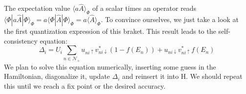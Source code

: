 \documentclass[../main.tex]{subfile}
\begin{document}
The expectation value $\langle a\hat{A}\rangle_{\Phi}$ of a scalar times an operator reads $\langle \Phi|a \hat{A}|\Phi\rangle_{\Phi} = a \langle \Phi|\hat{A}|\Phi\rangle_{\Phi} = a \langle \hat{A}\rangle_{\Phi}$. 
To convince ourselves, we just take a look at the first quantization expression of this braket. This result leads to the self-consistency equation:
\begin{equation}\label{eq:SelfConsitentDelta}
    \Delta_i = U_i\sum_{n\in\mathcal{N}_+} u_{ni\uparrow} v_{ni\downarrow}^{\ast} \left(1-f(E_n)\right) + u_{ni\downarrow} v_{ni\uparrow}^{\ast}f(E_n)
\end{equation}
We plan to solve this equation numerically, inserting some guess in the Hamiltonian, diagonalize it, update $\Delta_i$ and reinsert it into H. We should repeat this 
until we reach a fix point or the desired accuracy.\\
\end{document}
